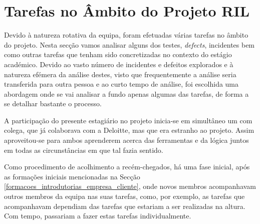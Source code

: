\section{Tarefas no Âmbito do Projeto RIL}\label{sec:def_e_inc}

    Devido à natureza rotativa da equipa, foram efetuadas várias tarefas no âmbito do projeto. Nesta secção vamos analisar alguns dos testes, \textit{defects}, incidentes bem como outras tarefas que tenham sido concretizadas no contexto do estágio académico. Devido ao vasto número de incidentes e defeitos explorados e à natureza efémera da análise destes, visto que frequentemente a análise seria transferida para outra pessoa e ao curto tempo de análise, foi escolhida uma abordagem onde se vai analisar a fundo apenas algumas das tarefas, de forma a se detalhar bastante o processo.

    A participação do presente estagiário no projeto inicia-se em simultâneo um com colega, que já colaborava com a Deloitte, mas que era estranho ao projeto. Assim aproveitou-se para ambos aprenderem acerca das ferramentas e da lógica juntos em todas as circunstâncias em que tal fazia sentido.

    Como procedimento de acolhimento a recém-chegados, há uma fase inicial, após as formações iniciais mencionadas na Secção \ref{formacoes_introdutorias_empresa_cliente}, onde novos membros acompanhavam outros membros da equipa nas suas tarefas, como, por exemplo, as tarefas que acompanhavam dependiam das tarefas que estariam a ser realizadas na altura. Com tempo, passariam a fazer estas tarefas individualmente.

    

    

    

    

    
        
